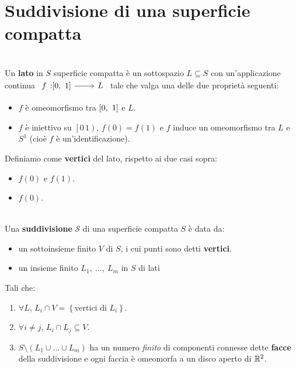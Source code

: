 \section{Suddivisione di una superficie compatta}
\begin{define}[Lato.]~{}\\
	Un \textbf{lato} in $S$ superficie compatta è un sottospazio $L\subseteq S$ con un'applicazione continua $\funz{f}{\intv}{L}$ tale che valga una delle due proprietà seguenti:
	\begin{itemize}
		\item $f$ è omeomorfismo tra $\left[0,\ 1\right]$ e $L$.
		\item $f$ è iniettivo su $\left[0\, 1\right)$, $f\left(0\right)=f\left(1\right)$ e $f$ induce un omeomorfismo tra $L$ e $S^1$ (cioè $f$ è un'identificazione).
	\end{itemize}
Definiamo come \textbf{vertici} del lato, rispetto ai due casi sopra:
\begin{itemize}
	\item $f\left(0\right)$ e $f\left(1\right)$.
	\item $f\left(0\right)$.
\end{itemize}
\vspace{-3mm}
\end{define}
\begin{define}~{}\\
	Una \textbf{suddivisione} $\mathcal
	S$ di una superficie compatta $S$ è data da:
	\begin{itemize}
		\item un sottoinsieme finito $V$ di $S$, i cui punti sono detti \textbf{vertici}.
		\item un insieme finito $L_1,\ \ldots,\ L_m$ in $S$ di lati
	\end{itemize}
Tali che:
\begin{enumerate}
	\item $\forall L$, $L_i\cap V=\left\{\text{vertici di }L_i\right\}$.
	\item $\forall i\neq j$, $L_i\cap L_j\subseteq V$.
	\item $S\setminus\left(L_1\cup\ldots\cup L_m\right)$ ha un numero \textit{finito} di componenti connesse dette \textbf{facce} della suddivisione e ogni faccia è omeomorfa a un disco aperto di $\mathbb{R}^2$.
\end{enumerate}
\vspace{-3mm}
\end{define}	
